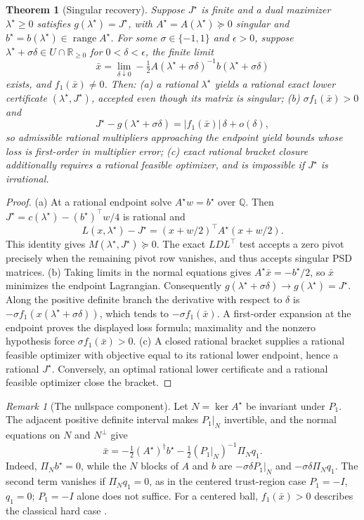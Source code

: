 \documentclass[11pt]{article}
\newcommand{\R}{\mathbb{R}}
\newcommand{\Q}{\mathbb{Q}}
\theoremstyle{plain}
\newtheorem{theorem}{Theorem}
\theoremstyle{remark}
\newtheorem*{remark}{Remark}
\begin{document}
\begin{theorem}[Singular recovery]\label{thm:hard}
Suppose $J^\star$ is finite and a dual maximizer $\lambda^\star\ge0$ satisfies
$g(\lambda^\star)=J^\star$, with $A^\star=A(\lambda^\star)\succeq0$ singular
and $b^\star=b(\lambda^\star)\in\operatorname{range}A^\star$.
For some $\sigma\in\{-1,1\}$ and $\epsilon>0$, suppose
$\lambda^\star+\sigma\delta\in U\cap\R_{\ge0}$ for $0<\delta<\epsilon$,
the finite limit
\[
\bar x=\lim_{\delta\downarrow0}
-\tfrac12 A(\lambda^\star+\sigma\delta)^{-1}
b(\lambda^\star+\sigma\delta)
\]
exists, and $f_1(\bar x)\ne0$. Then:
(a) a rational $\lambda^\star$ yields a rational exact lower certificate
$(\lambda^\star,J^\star)$, accepted even though its matrix is singular;
(b) $\sigma f_1(\bar x)>0$ and
\[
J^\star-g(\lambda^\star+\sigma\delta)
=|f_1(\bar x)|\,\delta+o(\delta),
\]
so admissible rational multipliers approaching the endpoint yield bounds whose
loss is first-order in multiplier error;
(c) exact rational bracket closure additionally requires a rational feasible
optimizer, and is impossible if $J^\star$ is irrational.
\end{theorem}
\begin{proof}
(a) At a rational endpoint solve $A^\star w=b^\star$ over $\Q$. Then
$J^\star=c(\lambda^\star)-(b^\star)^\top w/4$ is rational and
\[
L(x,\lambda^\star)-J^\star
=(x+w/2)^\top A^\star(x+w/2).
\]
This identity gives $M(\lambda^\star,J^\star)\succeq0$. The exact
$LDL^\top$ test accepts a zero pivot precisely when the remaining pivot row
vanishes, and thus accepts singular PSD matrices.
(b) Taking limits in the normal equations gives
$A^\star\bar x=-b^\star/2$, so $\bar x$ minimizes the endpoint Lagrangian.
Consequently $g(\lambda^\star+\sigma\delta)\to g(\lambda^\star)=J^\star$.
Along the positive definite branch the derivative with respect to $\delta$ is
$-\sigma f_1(x(\lambda^\star+\sigma\delta))$, which tends to
$-\sigma f_1(\bar x)$. A first-order expansion at the endpoint proves the
displayed loss formula; maximality and the nonzero hypothesis force
$\sigma f_1(\bar x)>0$.
(c) A closed rational bracket supplies a rational feasible optimizer with
objective equal to its rational lower endpoint, hence a rational $J^\star$.
Conversely, an optimal rational lower certificate and a rational feasible
optimizer close the bracket.
\end{proof}

\begin{remark}[The nullspace component]
Let $N=\ker A^\star$ be invariant under $P_1$. The adjacent positive definite
interval makes $P_1|_N$ invertible, and the normal equations on $N$ and
$N^\perp$ give
\begin{equation}
\bar x=-\tfrac12(A^\star)^\dagger b^\star
       -\tfrac12(P_1|_N)^{-1}\Pi_N q_1.
\label{eq:null-limit}
\end{equation}
Indeed, $\Pi_N b^\star=0$, while the $N$ blocks of $A$ and $b$ are
$-\sigma\delta P_1|_N$ and $-\sigma\delta\Pi_N q_1$. The second term vanishes
if $\Pi_N q_1=0$, as in the centered trust-region case $P_1=-I$, $q_1=0$;
$P_1=-I$ alone does not suffice. For a centered ball, $f_1(\bar x)>0$ describes
the classical hard case \cite{moresorensen1983}.
\end{remark}
\end{document}
